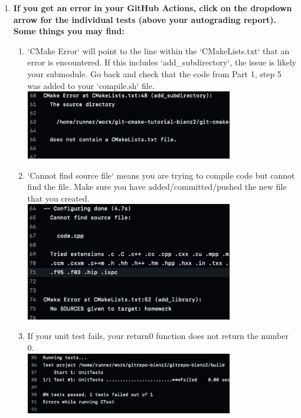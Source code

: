 \documentclass{article} %
\begin{document}
\begin{enumerate}
    \item \textbf{If you get an error in your GitHub Actions, click on the dropdown arrow for the individual tests (above your autograding report).  Some things you may find:}
    \begin{enumerate}
        \item `CMake Error` will point to the line within the `CMakeLists.txt` that an error is encountered.  If this includes `add\_subdirectory`, the issue is likely your submodule.  Go back and check that the code from Part 1, step 5 was added to your `compile.sh` file.\\
        \includegraphics[width=0.75\textwidth]{figs/error_submodule.png}

        \item `Cannot find source file` means you are trying to compile code but cannot find the file.  Make sure you have added/committed/pushed the new file that you created.\\
        \includegraphics[width=0.75\textwidth]{figs/error_code.png}

        
        \item If your unit test fails, your return0 function does not return the number 0.\\
        \includegraphics[width=0.75\textwidth]{figs/error_test.png}
    \end{enumerate}


\end{enumerate}
\end{document}
